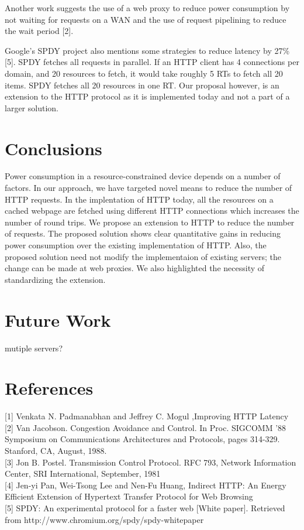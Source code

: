 \documentclass[9pt]{sigplan-proc-varsize}
\begin{document}
Another work suggests the use of a web proxy to reduce power consumption by not waiting for requests on a WAN and the use of request pipelining to reduce the wait period [2].

Google's SPDY project also mentions some strategies to reduce latency by 27\%[5]. SPDY fetches all requests in parallel. If an HTTP client has 4 connections per domain, and 20 resources to fetch, it would take roughly 5 RTs to fetch all 20 items. SPDY fetches all 20 resources in one RT. Our proposal however, is an extension to the HTTP protocol as it is implemented today and not a part of a larger solution.

\bigskip

\section{Conclusions}

Power consumption in a resource-constrained device depends on a number of factors. In our approach, we have targeted novel means to reduce the number of HTTP requests. In the implentation of HTTP today, all the resources on a cached webpage are fetched using different HTTP connections which increases the number of round trips. We propose an extension to HTTP to reduce the number of requests. The proposed solution shows clear quantitative gains in reducing power consumption over the existing implementation of HTTP. Also, the proposed solution need not modify the implementaion of existing servers; the change can be made at web proxies. We also highlighted the necessity of standardizing the extension.

\bigskip

\section{Future Work}

mutiple servers?

\bigskip

\section{References}

[1] Venkata N. Padmanabhan and Jeffrey C. Mogul ,Improving HTTP Latency \\[\baselineskip]
[2] Van Jacobson. Congestion Avoidance and Control. In Proc. SIGCOMM ’88 Symposium on Communications Architectures and Protocols, pages 314-329. Stanford, CA, August, 1988. \\[\baselineskip]
[3] Jon B. Postel. Transmission Control Protocol. RFC 793, Network Information Center, SRI International, September, 1981 \\[\baselineskip]
[4] Jen-yi Pan, Wei-Tsong Lee and Nen-Fu Huang, Indirect HTTP: An Energy Efficient Extension of Hypertext Transfer Protocol for Web Browsing \\[\baselineskip]
[5] SPDY: An experimental protocol for a faster web [White paper]. Retrieved from http://www.chromium.org/spdy/spdy-whitepaper
\end{document}
